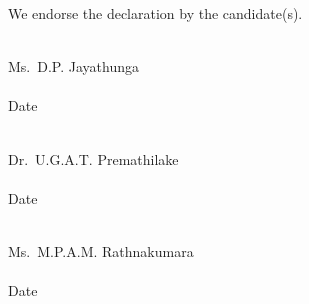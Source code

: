 \vspace{5mm}
\noindent We endorse the declaration by the candidate(s).

\vspace{5mm}
\noindent
\begin{minipage}[t]{0.48\textwidth}
    \vspace{0pt}
    \hrulefill \\[0.3em]
    Ms.\ D.P. Jayathunga \\[1.5em]
    
    \hrulefill \\[0.3em]
    Date
\end{minipage}%
\hfill
\begin{minipage}[t]{0.48\textwidth}
    \vspace{0pt}
    \hrulefill \\[0.3em]
    Dr.\ U.G.A.T. Premathilake \\[1.5em]

    \hrulefill \\[0.3em]
    Date
\end{minipage}

\vspace{5mm}
\noindent
\begin{minipage}[t]{0.48\textwidth}
    \vspace{0pt}
    \hrulefill \\[0.3em]
    Ms.\ M.P.A.M. Rathnakumara \\[1.5em]

    \hrulefill \\[0.3em]
    Date
\end{minipage}

\clearpage